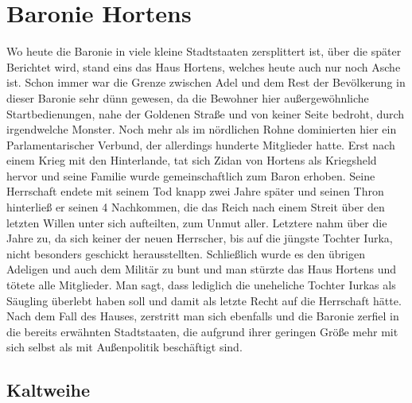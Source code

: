\documentclass[a4paper,12pt,oneside]{book}
\begin{document}
\section{Baronie Hortens}
Wo heute die Baronie in viele kleine Stadtstaaten zersplittert ist, über die später Berichtet wird, stand eins das Haus Hortens, welches heute auch nur noch Asche ist. Schon immer war die Grenze zwischen Adel und dem Rest der Bevölkerung in dieser Baronie sehr dünn gewesen, da die Bewohner hier außergewöhnliche Startbedienungen, nahe der Goldenen Straße und von keiner Seite bedroht, durch irgendwelche Monster. Noch mehr als im nördlichen Rohne dominierten hier ein Parlamentarischer Verbund, der allerdings hunderte Mitglieder hatte. Erst nach einem Krieg mit den Hinterlande, tat sich Zidan von Hortens als Kriegsheld hervor und seine Familie wurde gemeinschaftlich zum Baron erhoben. Seine Herrschaft endete mit seinem Tod knapp zwei Jahre später und seinen Thron hinterließ er seinen 4 Nachkommen, die das Reich nach einem Streit über den letzten Willen unter sich aufteilten, zum Unmut aller. Letztere nahm über die Jahre zu, da sich keiner der neuen Herrscher, bis auf die jüngste Tochter Iurka, nicht besonders geschickt herausstellten. Schließlich wurde es den übrigen Adeligen und auch dem Militär zu bunt und man stürzte das Haus Hortens und tötete alle Mitglieder. Man sagt, dass lediglich die uneheliche Tochter Iurkas als Säugling überlebt haben soll und damit als letzte Recht auf die Herrschaft hätte. Nach dem Fall des Hauses, zerstritt man sich ebenfalls und die Baronie zerfiel in die bereits erwähnten Stadtstaaten, die aufgrund ihrer geringen Größe mehr mit sich selbst als mit Außenpolitik beschäftigt sind.
\subsection{Kaltweihe}
 
\end{document}
